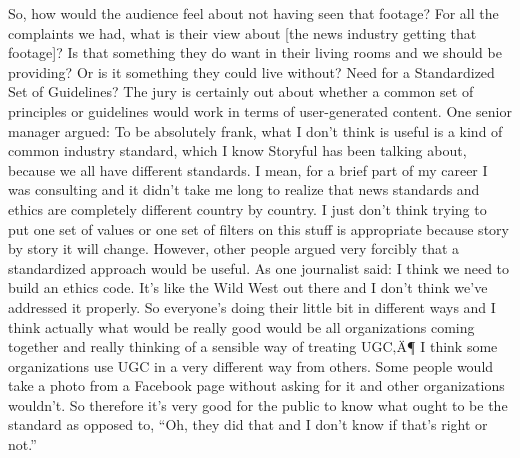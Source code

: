 \documentclass[symmetric, notoc, nobib]{towcenter-book}
\begin{document}
So, how would the audience feel about not having seen that footage?
For all the complaints we had, what is their view about [the news
industry getting that footage]? Is that something they do want in
their living rooms and we should be providing? Or is it something
they could live without?
Need for a Standardized Set of Guidelines?
The jury is certainly out about whether a common set of principles or
guidelines would work in terms of user-generated content. One senior
manager argued:
To be absolutely frank, what I don't think is useful is a kind of common
industry standard, which I know Storyful has been talking
about, because we all have different standards. I mean, for a brief part
of my career I was consulting and it didn't take me long to realize that
news standards and ethics are completely different country by country.
I just don't think trying to put one set of values or one set of filters
on this stuff is appropriate because story by story it will change.
However, other people argued very forcibly that a standardized approach
would be useful. As one journalist said:
I think we need to build an ethics code. It's like the Wild West out
there and I don't think we've addressed it properly. So everyone's
doing their little bit in different ways and I think actually what would
be really good would be all organizations coming together and really
thinking of a sensible way of treating UGC‚Ä¶ I think some organizations
use UGC in a very different way from others. Some people
would take a photo from a Facebook page without asking for it and
other organizations wouldn't. So therefore it's very good for the public
to know what ought to be the standard as opposed to, ``Oh, they
did that and I don't know if that's right or not.''
\end{document}
